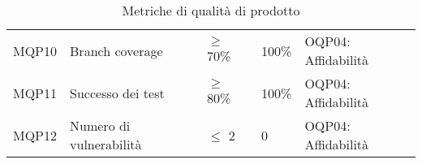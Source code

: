 \begin{table}[H]
\begin{tabular}{ m{}<{\centering}  m{}<{\centering}  m{}<{\centering}  m{}<{\centering} m{}<{\centering}}
        MQP10 &
        Branch coverage &
        $\geq$ 70\% &
        100\% &
        OQP04: Affidabilità \\

        MQP11 &
        Successo dei test &
        $\geq$ 80\% &
        100\% &
        OQP04: Affidabilità \\


        MQP12 &
        Numero di vulnerabilità &
        $\leq$ 2 &
        0 &
        OQP04: Affidabilità \\
    \end{tabular}
    \caption{Metriche di qualità di prodotto}
\end{table}